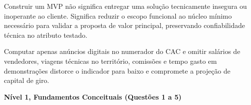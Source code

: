\begin{boxErro}
  Construir um MVP não significa entregar uma solução tecnicamente insegura ou inoperante ao cliente. Significa reduzir o escopo funcional ao núcleo mínimo necessário para validar a proposta de valor principal, preservando confiabilidade técnica no atributo testado.
\end{boxErro}

\begin{boxErro}
  Computar apenas anúncios digitais no numerador do CAC e omitir salários de vendedores, viagens técnicas no território, comissões e tempo gasto em demonstrações distorce o indicador para baixo e compromete a projeção de capital de giro.
\end{boxErro}


\textbf{Nível 1, Fundamentos Conceituais (Questões 1 a 5)}

